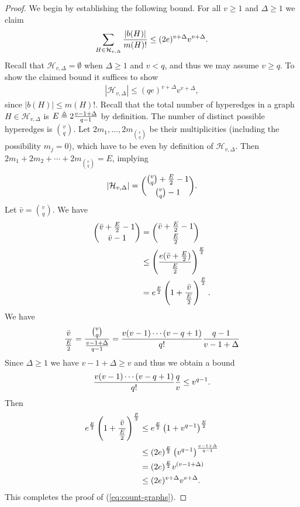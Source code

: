\documentclass[12pt]{article}
\newcommand{\cH}{\mathcal{H}}
\begin{document}
\begin{proof}
We begin by establishing the following bound. For all $v\ge 1$ and $\Delta\ge 1$ we claim 
\begin{align}\label{eq:count-graphs}
\sum_{H\in\mathcal{H}_{v,\Delta}}  {| b(H)| \over m(H)!}\le (2e)^{v+\Delta} v^{v+\Delta}.
\end{align}
Recall that $\cH_{v,\Delta}=\emptyset$ when $\Delta\ge 1$ and $v<q$, and thus we may assume $v\ge q$.
To show the claimed bound it suffices to show 
\begin{align*} |\mathcal{H}_{v,\Delta}|\le  (qe)^{v+\Delta} v^{v+\Delta},
\end{align*}
since $|b(H)|\le m(H)!$. Recall that the total number of hyperedges 
in a graph $H\in\mathcal{H}_{v,\Delta}$ is $E\triangleq 2{v-1+\Delta\over q-1}$ by definition. The number of distinct possible hyperedges is ${v\choose q}$. 
Let $2m_1,\ldots,2m_{v\choose q}$ be their multiplicities (including the possibility $m_j=0$), which have to be even by definition of $\mathcal{H}_{v,\Delta}$. 
Then $2m_1+2m_2+\cdots+2m_{v\choose q}=E$, implying   
\begin{align*}
| \mathcal{H}_{v,\Delta}|={{v\choose q}+{E\over 2}-1\choose {v\choose q}-1}.
\end{align*}
Let $\bar v={v\choose q}$. We have
\begin{align*}
{\bar v +{E\over 2}-1 \choose \bar v-1}
&=
{\bar v +{E\over 2}-1 \choose {E\over 2}} \\
 &\le \left( {e (\bar v+{E\over 2})\over {E\over 2}} \right)^{{E\over 2}}  \\
&=e^{{E\over 2}}\left(1+{\bar v \over {E\over 2}}\right)^{{E\over 2}}.
\end{align*}
We have
\begin{align*}
{\bar v \over {E\over 2}}={{v\choose q} \over {v-1+\Delta \over q-1}}={v(v-1)\cdots(v-q+1) \over q!}{q-1\over v-1+\Delta}
\end{align*}
Since $\Delta\ge 1$ we have $v-1+\Delta\ge v$ and thus 
we obtain a bound
\begin{align*}
{v(v-1)\cdots(v-q+1) \over q!}{q\over v}
\le v^{q-1}.
\end{align*}
Then
\begin{align*}
e^{{E\over 2}}\left(1+{\bar v \over {E\over 2}}\right)^{{E\over 2}} &\le e^{E\over 2} \left(1+v^{q-1}\right)^{E\over 2} \\
&\le (2e)^{E\over 2} \left(v^{q-1}\right)^{{v-1+\Delta\over q-1}} \\
&= (2e)^{E\over 2} v^{(v-1+\Delta)} \\
&\le (2e)^{v+\Delta} v^{v+\Delta}.
\end{align*}
This completes the proof of (\ref{eq:count-graphs}).


\end{proof}
\end{document}
